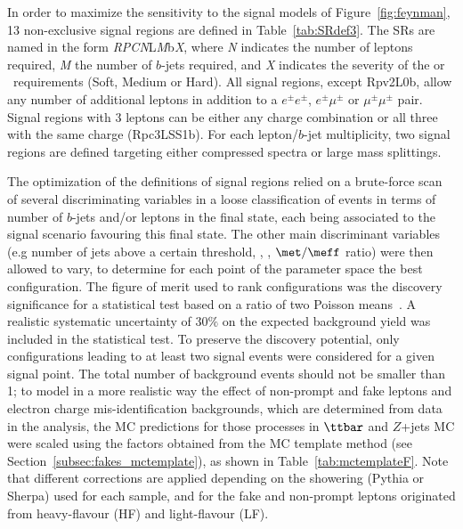In order to maximize the sensitivity to the signal models of Figure~\ref{fig:feynman}, 13 non-exclusive signal regions are defined in Table~\ref{tab:SRdef3}. 
The SRs are named in the form \textit{RPCN}L{\textit M}b{\textit X}, where {\textit N} indicates the number of leptons required, {\textit M} the number of $b$-jets required, and {\textit X} indicates the severity 
of the \met or \meff\ requirements (Soft, Medium or Hard). All signal regions, except Rpv2L0b, allow any number of additional leptons in addition to a $e^\pm e^\pm$,
$e^\pm \mu^\pm$ or $\mu^\pm \mu^\pm$ pair. Signal regions with 3 leptons can be either any charge combination or all three with the same charge (Rpc3LSS1b).
For each lepton/$b$-jet multiplicity, two signal regions are defined targeting either compressed spectra or large mass splittings. 

The optimization of the definitions of signal regions relied on a brute-force
scan of several discriminating variables in a loose classification of events 
in terms of number of $b$-jets and/or leptons in the final state, each being 
associated to the signal scenario favouring this final state.
The other main discriminant variables (e.g number of jets above a certain \pt threshold, \meff, \met, $\met/\meff$ ratio) were then allowed to vary, 
to determine for each point of the parameter space the best configuration. 
The figure of merit used to rank configurations was the discovery significance 
for a statistical test based on a ratio of two Poisson means~\cite{Cousins:2009}.
A realistic systematic uncertainty of $30\%$ on the expected background yield 
was included in the statistical test.
To preserve the discovery potential, only configurations leading to at least two signal events were considered for a given signal point. The total number of background events should not be smaller than 1; to model in a more realistic way the effect of non-prompt and fake leptons and electron charge mis-identification backgrounds, 
which are determined from data in the analysis, 
the MC predictions for those processes in $\ttbar$ and $Z$+jets MC were scaled 
using the factors obtained from the MC template method (see Section~\ref{subsec:fakes_mctemplate}), as shown in Table~\ref{tab:mctemplateF}.
Note that different corrections are applied depending on the showering (Pythia or Sherpa) used for each sample, 
and for the fake and non-prompt leptons originated from heavy-flavour (HF) and light-flavour (LF).

